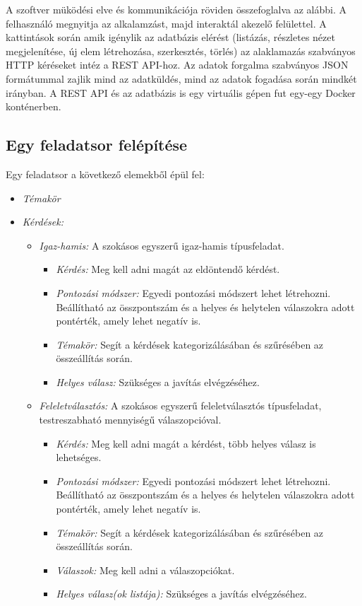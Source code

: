 A szoftver müködési elve és kommunikációja röviden összefoglalva az alábbi.
A felhasználó megnyitja az alkalamzást, majd interaktál akezelő felülettel.
A kattintások során amik igénylik az adatbázis elérést (listázás, részletes nézet megjelenítése, új elem létrehozása, szerkesztés, törlés) az alaklamazás szabványos HTTP kéréseket intéz a REST API-hoz.
Az adatok forgalma szabványos JSON formátummal zajlik mind az adatküldés, mind az adatok fogadása során mindkét irányban.
A REST API és az adatbázis is egy virtuális gépen fut egy-egy Docker konténerben.


\subsection{Egy feladatsor felépítése}

Egy feladatsor a következő elemekből épül fel:

\begin{itemize}
	\item \emph{Témakör}
	\item \emph{Kérdések:}
        \begin{itemize}
            \item \emph{Igaz-hamis:} A szokásos egyszerű igaz-hamis típusfeladat.
                \begin{itemize}
                    \item \emph{Kérdés:} Meg kell adni magát az eldöntendő kérdést.
                    \item \emph{Pontozási módszer:} Egyedi pontozási módszert lehet létrehozni. Beállítható az összpontszám és a helyes és helytelen válaszokra adott pontérték, amely lehet negatív is.
                    \item \emph{Témakör:} Segít a kérdések kategorizálásában és szűrésében az összeállítás során.
                    \item \emph{Helyes válasz:} Szükséges a javítás elvégzéséhez.
                \end{itemize}
            \item \emph{Feleletválasztós:} A szokásos egyszerű feleletválasztós típusfeladat, testreszabható mennyiségű válaszopcióval.
                \begin{itemize}
                    \item \emph{Kérdés:} Meg kell adni magát a kérdést, több helyes válasz is lehetséges.
                    \item \emph{Pontozási módszer:} Egyedi pontozási módszert lehet létrehozni. Beállítható az összpontszám és a helyes és helytelen válaszokra adott pontérték, amely lehet negatív is.
                    \item \emph{Témakör:} Segít a kérdések kategorizálásában és szűrésében az összeállítás során.
                    \item \emph{Válaszok:} Meg kell adni a válaszopciókat.
                    \item \emph{Helyes válasz(ok listája):} Szükséges a javítás elvégzéséhez.
                \end{itemize}
        \end{itemize}
\end{itemize}

